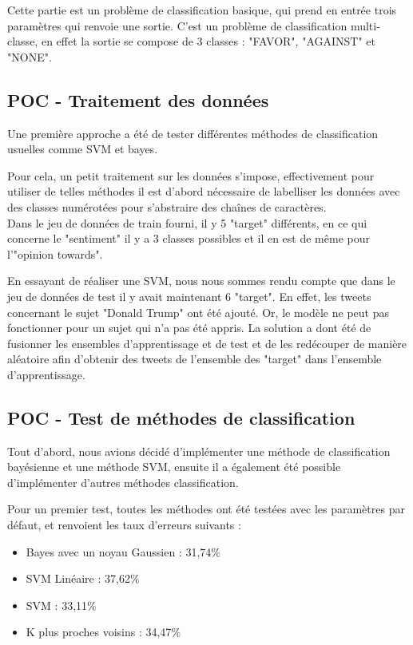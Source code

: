 Cette partie est un problème de classification basique, qui prend en entrée trois paramètres qui renvoie une sortie. C'est un problème de classification multi-classe, en effet la sortie se compose de 3 classes : "FAVOR", "AGAINST" et "NONE". \\

\subsection{POC - Traitement des données}

Une première approche a été de tester différentes méthodes de classification usuelles comme SVM et bayes.

Pour cela, un petit traitement sur les données s'impose, effectivement pour utiliser de telles méthodes il est d'abord nécessaire de labelliser les données avec des classes numérotées pour s'abstraire des chaînes de caractères. \\
Dans le jeu de données de train fourni, il y 5 "target" différents, en ce qui concerne le "sentiment" il y a 3 classes possibles et il en est de même pour l'"opinion towards".

En essayant de réaliser une SVM, nous nous sommes rendu compte que dans le jeu de données de test il y avait maintenant 6 "target". En effet, les tweets concernant le sujet "Donald Trump" ont été ajouté. Or, le modèle ne peut pas fonctionner pour un sujet qui n'a pas été appris. 
La solution a dont été de fusionner les ensembles d'apprentissage et de test et de les redécouper de manière aléatoire afin d'obtenir des tweets de l'ensemble des "target" dans l'ensemble d'apprentissage.

\subsection{POC - Test de méthodes de classification}

Tout d'abord, nous avions décidé d'implémenter une méthode de classification bayésienne et une méthode SVM, ensuite il a également été possible d'implémenter d'autres méthodes classification.

Pour un premier test, toutes les méthodes ont été testées avec les paramètres par défaut, et renvoient les taux d'erreurs suivants :
\begin{itemize}
\item Bayes avec un noyau Gaussien : 31,74$\%$
\item SVM Linéaire : 37,62$\%$
\item SVM : 33,11$\%$
\item K plus proches voisins : 34,47$\%$
\end{itemize}

